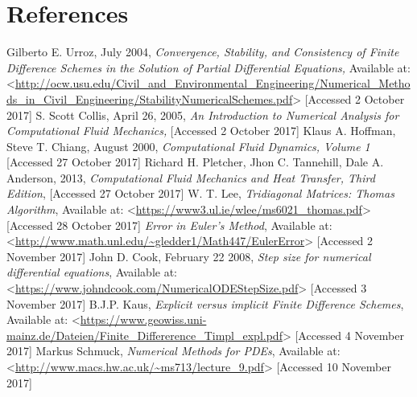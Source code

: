 \documentclass[12pt]{report}
\begin{document}
\newpage
\section*{References}

Gilberto E. Urroz, July 2004, \textit{Convergence, Stability, and Consistency of Finite
Difference Schemes in the Solution of Partial Differential
Equations,} Available at: <\url{http://ocw.usu.edu/Civil_and_Environmental_Engineering/Numerical_Methods_in_Civil_Engineering/StabilityNumericalSchemes.pdf}> [Accessed 2 October 2017]
\newline
\newline
S. Scott Collis, April 26, 2005, \textit{An Introduction to Numerical Analysis
for Computational Fluid Mechanics,} [Accessed 2 October 2017]
\newline
\newline
Klaus A. Hoffman, Steve T. Chiang, August 2000, \textit{Computational Fluid Dynamics, Volume 1} [Accessed 27 October 2017]
\newline
\newline
Richard H. Pletcher, Jhon C. Tannehill, Dale A. Anderson, 2013, \textit{Computational Fluid Mechanics and Heat Transfer, Third Edition}, [Accessed 27 October 2017]
\newline
\newline
W. T. Lee, \textit{Tridiagonal Matrices: Thomas Algorithm}, Available at: <\url{https://www3.ul.ie/wlee/ms6021_thomas.pdf}> [Accessed 28 October 2017]
\newline
\newline
\textit{ Error in Euler’s Method}, Available at: <\url{http://www.math.unl.edu/~gledder1/Math447/EulerError}> [Accessed 2 November 2017]
\newline
\newline
John D. Cook, February 22 2008, \textit{ Step size for numerical differential equations}, Available at: <\url{https://www.johndcook.com/NumericalODEStepSize.pdf}> [Accessed 3 November 2017]
\newline
\newline
B.J.P. Kaus, \textit{Explicit versus implicit Finite Difference Schemes}, Available at: <\url{https://www.geowiss.uni-mainz.de/Dateien/Finite_Differerence_Timpl_expl.pdf}> [Accessed 4 November 2017]
\newline
\newline
Markus Schmuck, \textit{Numerical Methods for PDEs}, Available at: <\url{http://www.macs.hw.ac.uk/~ms713/lecture_9.pdf}> [Accessed 10 November 2017]
\end{document}
